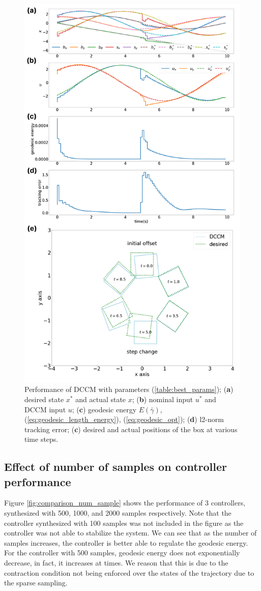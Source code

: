 \documentclass[journal]{IEEEtran}
\begin{document}
\begin{figure}[h]
	\centering\includegraphics[width = 0.47 \textwidth]
	{figures/result_lbw10_2000samples.png}
    \caption{Performance of DCCM with parameters (\ref{table:best_params}); (\textbf{a}) desired state $x^*$ and actual state $x$; (\textbf{b}) nominal input $u^*$ and DCCM input $u$; (\textbf{c}) geodesic energy $E(\bar{\gamma})$, (\ref{eq:geodesic_length_energy}), (\ref{eq:geodesic_opt}); (\textbf{d}) l2-norm tracking error; (\textbf{c}) desired and actual positions of the box at various time steps.}
	\label{fig:result_2000}
\end{figure}

\subsection{Effect of number of samples on controller performance}
Figure \ref{fig:comparison_num_sample} shows the performance of 3 controllers, synthesized with 500, 1000, and 2000 samples respectively. Note that the controller synthesized with 100 samples was not included in the figure as the controller was not able to stabilize the system. We can see that as the number of samples increases, the controller is better able to regulate the geodesic energy. For the controller with 500 samples, geodesic energy does not exponentially decrease, in fact, it increases at times. We reason that this is due to the contraction condition not being enforced over the states of the trajectory due to the sparse sampling.
\end{document}
